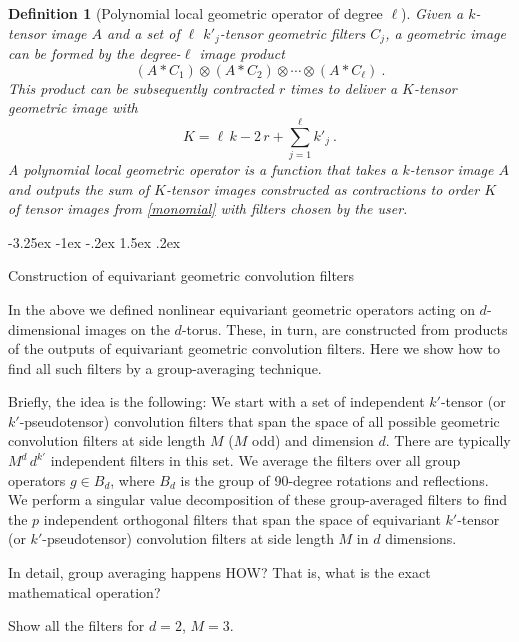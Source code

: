 \documentclass{article}
\makeatletter
\theoremstyle{plain}
\newtheorem{definition}{Definition}
\renewcommand\section{\@startsection {section}{1}{\z@}%
  {-3.25ex \@plus -1ex \@minus -.2ex}%
  {1.5ex \@plus .2ex}%
  {\raggedright\normalfont\large\bfseries}}
\makeatother
\begin{document}
\begin{definition}[Polynomial local geometric operator of degree $\ell$]
Given a $k$-tensor image $A$ and a set of $\ell$ $k'_j$-tensor geometric filters $C_j$, a geometric image can be formed by the degree-$\ell$ image product
\begin{equation}
    (A\ast C_1) \otimes (A\ast C_2) \otimes \cdots \otimes (A\ast C_\ell) ~. \label{monomial}
\end{equation}
This product can be subsequently contracted $r$ times to deliver a $K$-tensor geometric image with
\begin{equation}
    K = \ell\,k - 2\,r + \sum_{j=1}^\ell k'_j ~.
\end{equation}
A polynomial local geometric operator is a function that takes a $k$-tensor image $A$ and outputs the sum of $K$-tensor images constructed as contractions to order $K$ of tensor images from \eqref{monomial} with filters chosen by the user. 
\end{definition}

\section{Construction of equivariant geometric convolution filters}

In the above we defined nonlinear equivariant geometric operators acting on $d$-dimensional images on the $d$-torus.
These, in turn, are constructed from products of the outputs of equivariant geometric convolution filters.
Here we show how to find all such filters by a group-averaging technique.

Briefly, the idea is the following:
We start with a set of independent $k'$-tensor (or $k'$-pseudotensor) convolution filters that span the space of all possible geometric convolution filters at side length $M$ ($M$ odd) and dimension $d$.
There are typically $M^d\,d^{k'}$ independent filters in this set.
We average the filters over all group operators $g\in B_d$, where $B_d$ is the group of 90-degree rotations and reflections.
We perform a singular value decomposition of these group-averaged filters to find the $p$ independent orthogonal filters that span the space of equivariant $k'$-tensor (or $k'$-pseudotensor) convolution filters at side length $M$ in $d$ dimensions.

In detail, group averaging happens HOW? That is, what is the exact mathematical operation?

Show all the filters for $d=2$, $M=3$.
\end{document}
